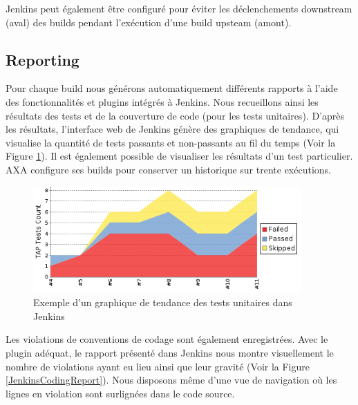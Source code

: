       Jenkins peut également être configuré pour éviter les déclenchements downstream (aval) des builds pendant l'exécution d'une build upsteam (amont).

    \subsection{Reporting}
    Pour chaque build nous générons automatiquement différents rapports à l'aide des fonctionnalités et plugins intégrés à Jenkins. Nous recueillons ainsi les résultats des tests et de la couverture de code (pour les tests unitaires). D'après les résultats, l'interface web de Jenkins génère des graphiques de tendance, qui visualise la quantité de tests passants et non-passants au fil du temps (Voir la Figure \ref{JenkinsTestReport}). Il est également possible de visualiser les résultats d'un test particulier. AXA configure ses builds pour conserver un historique sur trente exécutions.\\

    \begin{figure}
      \begin{center}
        \includegraphics[scale=1]{images/JenkinsTestReport.png}
      \end{center}
      \caption{Exemple d'un graphique de tendance des tests unitaires dans Jenkins}
      \label{JenkinsTestReport}
    \end{figure}

    Les violations de conventions de codage sont également enregistrées. Avec le plugin adéquat, le rapport présenté dans Jenkins nous montre visuellement le nombre de violations ayant eu lieu ainsi que leur gravité (Voir la Figure \ref{JenkinsCodingReport}). Nous disposons même d'une vue de navigation où les lignes en violation sont surlignées dans le code source.\\

